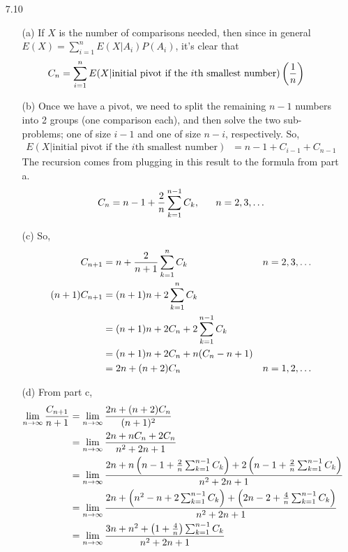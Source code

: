 \documentclass[english, 11pt]{article}
\begin{document}
\begin{itemize}
  \item[7.10]
  \begin{itemize}
    \item[(a)] If $X$ is the number of comparisons needed, then since in general $E(X) = \sum_{i = 1}^n E(X|A_i)P(A_i)$, it's clear that
    \begin{align*}
      C_n & = \sum_{i = 1}^n E(X|\mbox{initial pivot if the $i$th smallest number})\left( \frac{1}{n} \right)
    \end{align*}
    \item[(b)] Once we have a pivot, we need to split the remaining $n-1$ numbers into 2 groups (one comparison each), and then solve the two sub-problems; one of size $i-1$ and one of size $n-i$, respectively. So,
    \begin{align*}
        E(X|\mbox{initial pivot if the $i$th smallest number}) & = n - 1 + C_{i-1} + C_{n-1}
    \end{align*}
    The recursion comes from plugging in this result to the formula from part a.
    \[ C_n  = n - 1 + \f{2}{n} \sum_{k = 1}^{n-1} C_k, \ \ \ \ \  n = 2, 3, \ldots \]
    \item[(c)] So,
    \begin{align*}
      C_{n+1} & = n + \frac{2}{n+1}\sum_{k=1}^n C_k & n = 2, 3, \ldots\\
      (n+1)C_{n+1} & = (n+1)n + 2\sum_{k=1}^n C_k \\
      & = (n+1)n + 2C_n + 2\sum_{k = 1}^{n-1}C_k \\
      & = (n+1)n + 2C_n + n(C_n - n + 1) \\
      & = 2n + (n+2)C_n & n = 1, 2, \ldots
    \end{align*}
    \item[(d)] From part c,
    \begin{align*}
      \lim_{n \rightarrow \infty} \frac{C_{n+1}}{n+1} & = \lim_{n \rightarrow \infty} \frac{2n + (n+2)C_n}{(n+1)^2} \\
      & = \lim_{n \rightarrow \infty} \frac{2n + nC_n + 2C_n}{n^2 + 2n + 1} \\
      & = \lim_{n \rightarrow \infty} \frac{2n + n \left( n - 1 + \frac{2}{n} \sum_{k = 1}^{n-1} C_k \right) + 2 \left( n - 1 + \frac{2}{n} \sum_{k = 1}^{n-1} C_k \right)}{n^2 + 2n + 1} \\
      & = \lim_{n \rightarrow \infty} \frac{2n + \left( n^2 - n + 2 \sum_{k = 1}^{n-1} C_k \right) + \left( 2n - 2 + \frac{4}{n} \sum_{k = 1}^{n-1} C_k \right)}{n^2 + 2n + 1} \\
      & = \lim_{n \rightarrow \infty} \frac{3n + n^2 + \left( 1 + \frac{4}{n} \right)\sum_{k = 1}^{n-1} C_k}{n^2 + 2n + 1} \\
    \end{align*}
  \end{itemize}


\end{itemize}
\end{document}
